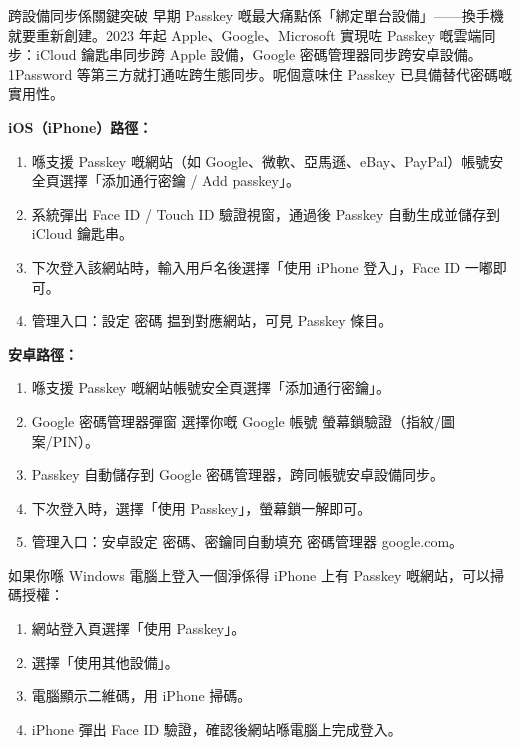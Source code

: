 \begin{tcbinfo}{跨設備同步係關鍵突破}
早期 Passkey 嘅最大痛點係「綁定單台設備」——換手機就要重新創建。2023 年起 Apple、Google、Microsoft 實現咗 Passkey 嘅雲端同步：iCloud 鑰匙串同步跨 Apple 設備，Google 密碼管理器同步跨安卓設備。1Password 等第三方就打通咗跨生態同步。呢個意味住 Passkey 已具備替代密碼嘅實用性。

\end{tcbinfo}


\textbf{iOS（iPhone）路徑：}

\begin{enumerate}
  \item 喺支援 Passkey 嘅網站（如 Google、微軟、亞馬遜、eBay、PayPal）帳號安全頁選擇「添加通行密鑰 / Add passkey」。
  \item 系統彈出 Face ID / Touch ID 驗證視窗，通過後 Passkey 自動生成並儲存到 iCloud 鑰匙串。
  \item 下次登入該網站時，輸入用戶名後選擇「使用 iPhone 登入」，Face ID 一嘟即可。
  \item 管理入口：設定 密碼 揾到對應網站，可見 Passkey 條目。
\end{enumerate}

\textbf{安卓路徑：}

\begin{enumerate}
  \item 喺支援 Passkey 嘅網站帳號安全頁選擇「添加通行密鑰」。
  \item Google 密碼管理器彈窗 選擇你嘅 Google 帳號 螢幕鎖驗證（指紋/圖案/PIN）。
  \item Passkey 自動儲存到 Google 密碼管理器，跨同帳號安卓設備同步。
  \item 下次登入時，選擇「使用 Passkey」，螢幕鎖一解即可。
  \item 管理入口：安卓設定 密碼、密鑰同自動填充 密碼管理器 google.com。
\end{enumerate}


如果你喺 Windows 電腦上登入一個淨係得 iPhone 上有 Passkey 嘅網站，可以掃碼授權：

\begin{enumerate}
  \item 網站登入頁選擇「使用 Passkey」。
  \item 選擇「使用其他設備」。
  \item 電腦顯示二維碼，用 iPhone 掃碼。
  \item iPhone 彈出 Face ID 驗證，確認後網站喺電腦上完成登入。
\end{enumerate}

